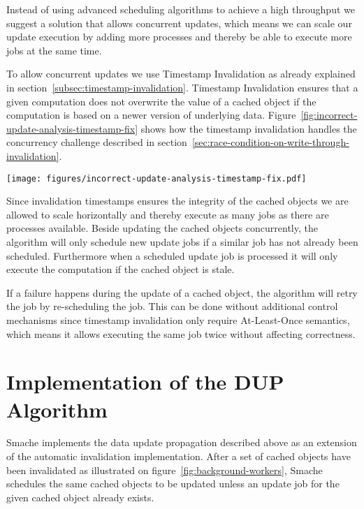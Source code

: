 Instead of using advanced scheduling algorithms to achieve a high throughput we suggest a solution that allows concurrent updates, which means we can scale our update execution by adding more processes and thereby be able to execute more jobs at the same time.

To allow concurrent updates we use Timestamp Invalidation as already explained in section~\ref{subsec:timestamp-invalidation}. Timestamp Invalidation ensures that a given computation does not overwrite the value of a cached object if the computation is based on a newer version of underlying data. Figure~\ref{fig:incorrect-update-analysis-timestamp-fix} shows how the timestamp invalidation handles the concurrency challenge described in section~\ref{sec:race-condition-on-write-through-invalidation}.

\begin{figure*}[ht!]
  \centering
  \texttt{[image: figures/incorrect-update-analysis-timestamp-fix.pdf]}
  \caption{How Invalidation Timestamps fixes the concurrency problem described in figure~\ref{fig:incorrect-updates-analysis}.}
  \label{fig:incorrect-update-analysis-timestamp-fix}
\end{figure*}

Since invalidation timestamps ensures the integrity of the cached objects we are allowed to scale horizontally and thereby execute as many jobs as there are processes available. Beside updating the cached objects concurrently, the algorithm will only schedule new update jobs if a similar job has not already been scheduled. Furthermore when a scheduled update job is processed it will only execute the computation if the cached object is stale.

If a failure happens during the update of a cached object, the algorithm will retry the job by re-scheduling the job. This can be done without additional control mechanisms since timestamp invalidation only require At-Least-Once semantics, which means it allows executing the same job twice without affecting correctness.


\section{Implementation of the DUP Algorithm}
\label{sec:implementing-the-data-updata-propagation-algorithm}

Smache implements the data update propagation described above as an extension of the automatic invalidation implementation. After a set of cached objects have been invalidated as illustrated on figure~\ref{fig:background-workers}, Smache schedules the same cached objects to be updated unless an update job for the given cached object already exists.

